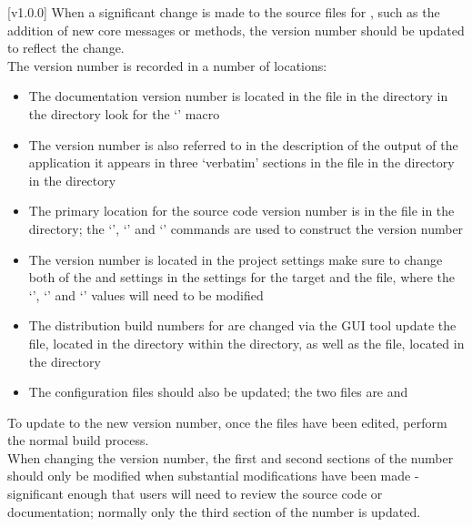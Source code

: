 [v1.0.0]
When a significant change is made to the source files for \mplusm, such as the addition of
new core messages or methods, the version number should be updated to reflect the
change.\\

The version number is recorded in a number of locations:
\begin{itemize}
\item The documentation version number is located in the  file
in the  directory in the  directory
\longDash{} look for the `' macro
\item\exSp{}The version number is also referred to in the description of the output of
the  application \longDash{} it appears in three `verbatim'
sections in the  file in the  directory in
the  directory
\item\exSp{}The primary location for the source code version number is in the
 file in the  directory; the
`', `'
and `' commands are used to construct the version
number
\item\exSp{}The \emph{\MMMU} version number is located in the  project
settings \longDash{} make sure to change both of the  and 
settings in the  settings for the \asCode{\MMMU} target \longDash{} and
the  file, where the `', `'
and `' values will need to be modified
\item\exSp{}The distribution build numbers for \osx{} are changed via the
 GUI tool \longDash{} update the  file, located in the
 directory within the 
directory, as well as the  file, located in the
 directory
\item\exSp{}The  configuration files should also be updated; the two
files are  and
\end{itemize}
To update to the new version number, once the files have been edited, perform the normal
build process.\\

When changing the version number, the first and second sections of the number should only
be modified when substantial modifications have been made - significant enough that users
will need to review the source code or documentation; normally only the third section of
the number is updated.
\appendixEnd{}



